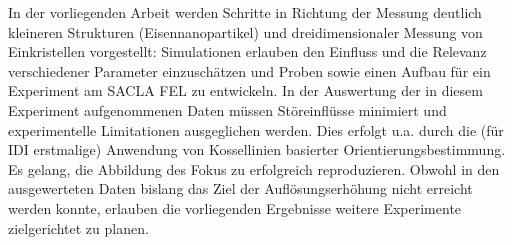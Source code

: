 In der vorliegenden Arbeit werden Schritte in Richtung der Messung deutlich kleineren Strukturen (Eisennanopartikel) und dreidimensionaler Messung von Einkristellen vorgestellt: Simulationen erlauben den Einfluss und die Relevanz verschiedener Parameter einzuschätzen und Proben sowie einen Aufbau für ein Experiment am SACLA FEL zu entwickeln. In der Auswertung der in diesem Experiment aufgenommenen Daten müssen Störeinflüsse minimiert und experimentelle Limitationen ausgeglichen werden. Dies erfolgt u.a. durch die (für IDI erstmalige) Anwendung von Kossellinien basierter Orientierungsbestimmung.  
Es gelang, die Abbildung des Fokus zu erfolgreich reproduzieren.  Obwohl in den ausgewerteten Daten bislang das Ziel der Auflösungserhöhung nicht erreicht werden konnte, erlauben die vorliegenden Ergebnisse weitere Experimente zielgerichtet zu planen.
